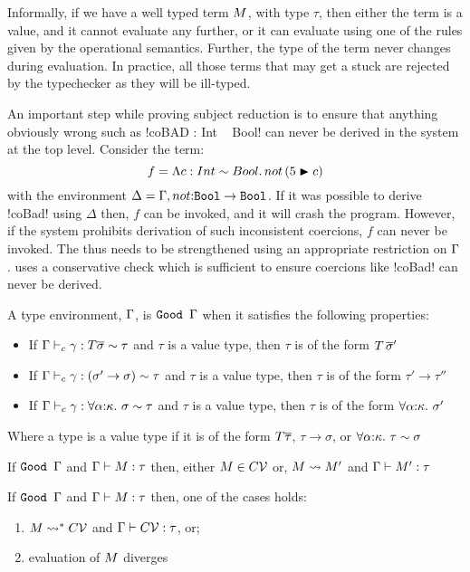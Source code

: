 \documentclass[screen,nonacm,manuscript,review]{acmart} %
\begin{document}
Informally, if we have a well typed term $M$, with type $\tau$, then
either the term is a value, and it cannot evaluate any further, or
it can evaluate using one of the rules given by the operational semantics.
Further, the type of the term never changes during evaluation.
In practice, all those terms that may get a stuck
are rejected by the typechecker as they will be ill-typed.

An important step while proving subject reduction is to ensure
that anything obviously wrong such as
!coBAD : Int ~ Bool! can never be derived in the
system at the top level. Consider the term:
\[ f = \Lambda c:Int \sim Bool.\, not\, (5\mathrel{\blacktriangleright}c)\]
with the environment $\Delta = \Gamma, not{:}\texttt{Bool} \to \texttt{Bool}$.
If it was possible to derive !coBad! using $\Delta$
then, $f$ can be invoked, and it will
crash the program. However, if the system prohibits derivation
of such inconsistent coercions, $f$ can never be invoked.
The  thus needs to be strengthened
using an appropriate restriction on $\Gamma$.
\SFC uses a conservative check which is sufficient to
ensure coercions like !coBad! can never be derived.

\begin{definition}[$\Good\TEnv$]
 A type environment, $\Gamma$, is $\Good\TEnv$ when it satisfies
 the following properties:
 \begin{itemize}
 \item If $\Gamma \vdash_{c} \gamma : T \overline{\sigma} \sim \tau$ and $\tau$
   is a value type, then $\tau$ is of the form $T\,\overline{\sigma}'$
 \item If $\Gamma \vdash_{c} \gamma : (\sigma' \to \sigma) \sim \tau$ and
   $\tau$ is a value type, then $\tau$ is of the form $\tau' \to \tau''$
 \item If $\Gamma \vdash_{c} \gamma : \forall\alpha{:}\kappa.~\sigma \sim
     \tau$ and $\tau$ is a value type, then $\tau$ is of the form
   $\forall\alpha{:}\kappa.~\sigma'$
 \end{itemize}
 Where a type is a value type if it is of the form $T\overline{\tau}$,
 $\tau\to\sigma$, or $\forall\alpha{:}\kappa.~\tau\sim\sigma$
\end{definition}

\begin{theorem}\label{thm:progress-sfc}
 If $\Good \TEnv$ and $\Gamma \vdash M : \tau$ then, either $M \in
 C\mathcal{V}$ or, $M \rightsquigarrow M'$ and $\Gamma \vdash M' : \tau$
\end{theorem}
\begin{corollary}
\label{thm:soundness-sfc}
 If $\Good \TEnv$ and $\Gamma \vdash M : \tau$ then, one of the cases holds:
 \begin{enumerate}
    \item $M \rightsquigarrow^* C\mathcal{V}$ and $\Gamma \vdash C\mathcal{V} : \tau$, or;
    \item evaluation of $M$ diverges
 \end{enumerate}
\end{corollary}
\end{document}
